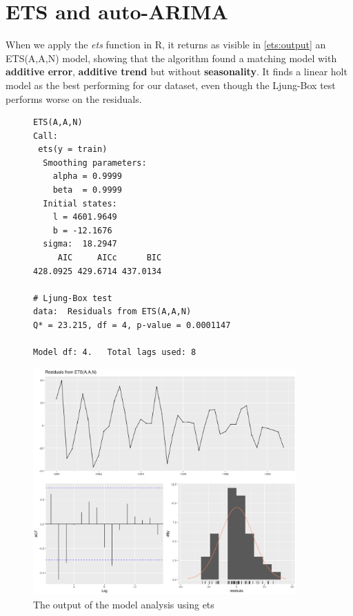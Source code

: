 \documentclass[10pt]{article}
\begin{document}
\section{ETS and auto-ARIMA}
When we apply the \textit{ets} function in R, it returns as visible in \autoref{ets:output} an ETS(A,A,N) model, showing that the algorithm found a matching model with \textbf{additive error}, \textbf{additive trend} but without \textbf{seasonality}. It finds a linear holt model as the best performing for our dataset, even though the Ljung-Box test performs worse on the residuals.\newline
\begin{figure}[h]
\begin{minipage}{.6\textwidth}  %
\lstset{linewidth = 6cm, breaklines=true} %
\begin{lstlisting}[basicstyle=\footnotesize,numbers=none]
ETS(A,A,N) 
Call:
 ets(y = train) 
  Smoothing parameters:
    alpha = 0.9999 
    beta  = 0.9999 
  Initial states:
    l = 4601.9649 
    b = -12.1676 
  sigma:  18.2947
     AIC     AICc      BIC 
428.0925 429.6714 437.0134 

# Ljung-Box test
data:  Residuals from ETS(A,A,N)
Q* = 23.215, df = 4, p-value = 0.0001147

Model df: 4.   Total lags used: 8
\end{lstlisting}
\label{lst:ets}
\end{minipage}
\qquad %
\begin{minipage}{0.6\textwidth} %
    \centering
    \includegraphics[width=0.9\textwidth]{img/check_resid_ets.png}
\end{minipage}
\caption{The output of the model analysis using ets}
\label{ets:output}
\end{figure}
\end{document}
